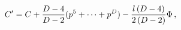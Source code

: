 \begin{equation}
\label{DMplanck} C^{\prime}=C+{D-4\over D-2}(p^{5}+\dots +p^D) -{l\, (D-4)\over
2\, (D-2)}\Phi\, ,
\end{equation} 
